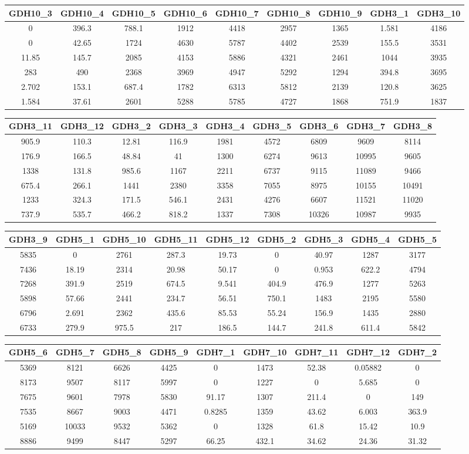 \documentclass[10pt,]{article}
\begin{document}
\begin{longtable}[]{@{}ccccccccc@{}}
\toprule
GDH10\_3 & GDH10\_4 & GDH10\_5 & GDH10\_6 & GDH10\_7 & GDH10\_8 &
GDH10\_9 & GDH3\_1 & GDH3\_10\tabularnewline
\midrule
\endhead
0 & 396.3 & 788.1 & 1912 & 4418 & 2957 & 1365 & 1.581 &
4186\tabularnewline
0 & 42.65 & 1724 & 4630 & 5787 & 4402 & 2539 & 155.5 &
3531\tabularnewline
11.85 & 145.7 & 2085 & 4153 & 5886 & 4321 & 2461 & 1044 &
3935\tabularnewline
283 & 490 & 2368 & 3969 & 4947 & 5292 & 1294 & 394.8 &
3695\tabularnewline
2.702 & 153.1 & 687.4 & 1782 & 6313 & 5812 & 2139 & 120.8 &
3625\tabularnewline
1.584 & 37.61 & 2601 & 5288 & 5785 & 4727 & 1868 & 751.9 &
1837\tabularnewline
\bottomrule
\end{longtable}

\begin{longtable}[]{@{}ccccccccc@{}}
\toprule
GDH3\_11 & GDH3\_12 & GDH3\_2 & GDH3\_3 & GDH3\_4 & GDH3\_5 & GDH3\_6 &
GDH3\_7 & GDH3\_8\tabularnewline
\midrule
\endhead
905.9 & 110.3 & 12.81 & 116.9 & 1981 & 4572 & 6809 & 9609 &
8114\tabularnewline
176.9 & 166.5 & 48.84 & 41 & 1300 & 6274 & 9613 & 10995 &
9605\tabularnewline
1338 & 131.8 & 985.6 & 1167 & 2211 & 6737 & 9115 & 11089 &
9466\tabularnewline
675.4 & 266.1 & 1441 & 2380 & 3358 & 7055 & 8975 & 10155 &
10491\tabularnewline
1233 & 324.3 & 171.5 & 546.1 & 2431 & 4276 & 6607 & 11521 &
11020\tabularnewline
737.9 & 535.7 & 466.2 & 818.2 & 1337 & 7308 & 10326 & 10987 &
9935\tabularnewline
\bottomrule
\end{longtable}

\begin{longtable}[]{@{}ccccccccc@{}}
\toprule
GDH3\_9 & GDH5\_1 & GDH5\_10 & GDH5\_11 & GDH5\_12 & GDH5\_2 & GDH5\_3 &
GDH5\_4 & GDH5\_5\tabularnewline
\midrule
\endhead
5835 & 0 & 2761 & 287.3 & 19.73 & 0 & 40.97 & 1287 & 3177\tabularnewline
7436 & 18.19 & 2314 & 20.98 & 50.17 & 0 & 0.953 & 622.2 &
4794\tabularnewline
7268 & 391.9 & 2519 & 674.5 & 9.541 & 404.9 & 476.9 & 1277 &
5263\tabularnewline
5898 & 57.66 & 2441 & 234.7 & 56.51 & 750.1 & 1483 & 2195 &
5580\tabularnewline
6796 & 2.691 & 2362 & 435.6 & 85.53 & 55.24 & 156.9 & 1435 &
2880\tabularnewline
6733 & 279.9 & 975.5 & 217 & 186.5 & 144.7 & 241.8 & 611.4 &
5842\tabularnewline
\bottomrule
\end{longtable}

\begin{longtable}[]{@{}ccccccccc@{}}
\toprule
GDH5\_6 & GDH5\_7 & GDH5\_8 & GDH5\_9 & GDH7\_1 & GDH7\_10 & GDH7\_11 &
GDH7\_12 & GDH7\_2\tabularnewline
\midrule
\endhead
5369 & 8121 & 6626 & 4425 & 0 & 1473 & 52.38 & 0.05882 &
0\tabularnewline
8173 & 9507 & 8117 & 5997 & 0 & 1227 & 0 & 5.685 & 0\tabularnewline
7675 & 9601 & 7978 & 5830 & 91.17 & 1307 & 211.4 & 0 &
149\tabularnewline
7535 & 8667 & 9003 & 4471 & 0.8285 & 1359 & 43.62 & 6.003 &
363.9\tabularnewline
5169 & 10033 & 9532 & 5362 & 0 & 1328 & 61.8 & 15.42 &
10.9\tabularnewline
8886 & 9499 & 8447 & 5297 & 66.25 & 432.1 & 34.62 & 24.36 &
31.32\tabularnewline
\bottomrule
\end{longtable}
\end{document}
